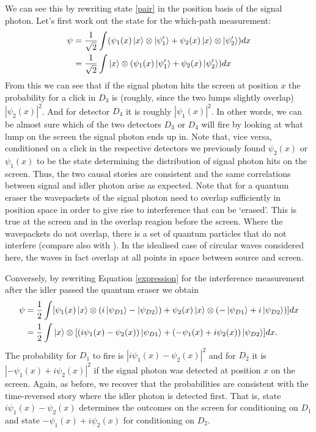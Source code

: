 \documentclass[11pt]{article}
\numberwithin{equation}{section}
\begin{document}
We can see this by rewriting state \ref{pair} in the position basis of the signal photon. Let's first work out the state for the which-path measurement:
\begin{align}
\psi&=\frac{1}{\sqrt{2}}\int(\psi_1(x)\ket{x}\otimes \ket{\psi_1'}+\psi_2(x)\ket{x}\otimes \ket{\psi_2'})dx\\ \nonumber
&= \frac{1}{\sqrt{2}}\int\ket{x}\otimes(\psi_1(x) \ket{\psi_1'}+\psi_2(x)\ket{\psi_2'})dx
\end{align}
From this we can see that if the signal photon hits the screen at position $x$ the probability for a click in $D_3$ is (roughly, since the two lumps slightly overlap) $|\psi_2(x)|^2$. And for detector $D_4$ it is roughly $|\psi_1(x)|^2$.  In other words, we can be almost sure which of the two detectors $D_3$ or $D_4$ will fire by looking at what lump on the screen the signal photon ends up in. Note that, vice versa, conditioned on a click in the respective detectors we previously found  $\psi_2(x)$ or $\psi_1(x)$ to be the state determining the distribution of signal photon hits on the screen. Thus, the two causal stories are consistent and the same correlations between signal and idler photon arise as expected. Note that for a quantum eraser the wavepackets of the signal photon need to overlap sufficiently in position space in order to give rise to interference that can be `erased'. This is true at the screen and in the overlap reagion before the screen. Where the wavepackets do not overlap, there is a set of quantum particles that do not interfere (compare also with \cite{Quanta87}). In the idealised case of circular waves considered here, the waves in fact overlap at all points in space between source and screen. 

Conversely, by rewriting Equation \ref{expression} for the interference measurement after the idler passed the quantum eraser we obtain
\begin{align}
\psi &= \frac{1}{2}\int[\psi_1(x)\ket{x}\otimes (i\ket{\psi_{D1}}-\ket{\psi_{D2}})+\psi_2(x)\ket{x}\otimes (-\ket{\psi_{D1}}+i\ket{\psi_{D2}})]dx \nonumber \\ &=\frac{1}{2}\int\ket{x}\otimes[(i\psi_1(x)-\psi_{2}(x))\ket{\psi_{D1}}+(-\psi_{1}(x)+i\psi_{2}(x))\ket{\psi_{D2}}]dx.
\end{align} The probability for $D_1$ to fire is $|i\psi_1(x)-\psi_{2}(x)|^2$ and for $D_2$ it is $|-\psi_1(x)+i\psi_{2}(x)|^2$ if the signal photon was detected at position $x$ on the screen. Again, as before, we recover that the probabilities are consistent with the time-reversed story where the idler photon is detected first. That is, state $i\psi_1(x)-\psi_{2}(x)$ determines the outcomes on the screen for conditioning on $D_1$ and state $-\psi_1(x)+i\psi_{2}(x)$ for conditioning on $D_2$.
\end{document}
